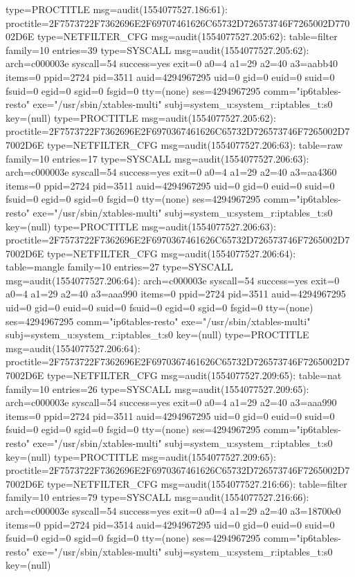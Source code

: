 \documentclass[]{report}
\newenvironment{Shaded}{}{}
\newcommand{\NormalTok}[1]{#1}
\begin{document}
\begin{Shaded}
\begin{Highlighting}[]
\NormalTok{type=PROCTITLE msg=audit(1554077527.186:61): proctitle=2F7573722F7362696E2F69707461626C65732D726573746F7265002D77002D6E}
\NormalTok{type=NETFILTER_CFG msg=audit(1554077527.205:62): table=filter family=10 entries=39}
\NormalTok{type=SYSCALL msg=audit(1554077527.205:62): arch=c000003e syscall=54 success=yes exit=0 a0=4 a1=29 a2=40 a3=aabb40 items=0 ppid=2724 pid=3511 auid=4294967295 uid=0 gid=0 euid=0 suid=0 fsuid=0 egid=0 sgid=0 fsgid=0 tty=(none) ses=4294967295 comm="ip6tables-resto" exe="/usr/sbin/xtables-multi" subj=system_u:system_r:iptables_t:s0 key=(null)}
\NormalTok{type=PROCTITLE msg=audit(1554077527.205:62): proctitle=2F7573722F7362696E2F6970367461626C65732D726573746F7265002D77002D6E}
\NormalTok{type=NETFILTER_CFG msg=audit(1554077527.206:63): table=raw family=10 entries=17}
\NormalTok{type=SYSCALL msg=audit(1554077527.206:63): arch=c000003e syscall=54 success=yes exit=0 a0=4 a1=29 a2=40 a3=aa4360 items=0 ppid=2724 pid=3511 auid=4294967295 uid=0 gid=0 euid=0 suid=0 fsuid=0 egid=0 sgid=0 fsgid=0 tty=(none) ses=4294967295 comm="ip6tables-resto" exe="/usr/sbin/xtables-multi" subj=system_u:system_r:iptables_t:s0 key=(null)}
\NormalTok{type=PROCTITLE msg=audit(1554077527.206:63): proctitle=2F7573722F7362696E2F6970367461626C65732D726573746F7265002D77002D6E}
\NormalTok{type=NETFILTER_CFG msg=audit(1554077527.206:64): table=mangle family=10 entries=27}
\NormalTok{type=SYSCALL msg=audit(1554077527.206:64): arch=c000003e syscall=54 success=yes exit=0 a0=4 a1=29 a2=40 a3=aaa990 items=0 ppid=2724 pid=3511 auid=4294967295 uid=0 gid=0 euid=0 suid=0 fsuid=0 egid=0 sgid=0 fsgid=0 tty=(none) ses=4294967295 comm="ip6tables-resto" exe="/usr/sbin/xtables-multi" subj=system_u:system_r:iptables_t:s0 key=(null)}
\NormalTok{type=PROCTITLE msg=audit(1554077527.206:64): proctitle=2F7573722F7362696E2F6970367461626C65732D726573746F7265002D77002D6E}
\NormalTok{type=NETFILTER_CFG msg=audit(1554077527.209:65): table=nat family=10 entries=26}
\NormalTok{type=SYSCALL msg=audit(1554077527.209:65): arch=c000003e syscall=54 success=yes exit=0 a0=4 a1=29 a2=40 a3=aaa990 items=0 ppid=2724 pid=3511 auid=4294967295 uid=0 gid=0 euid=0 suid=0 fsuid=0 egid=0 sgid=0 fsgid=0 tty=(none) ses=4294967295 comm="ip6tables-resto" exe="/usr/sbin/xtables-multi" subj=system_u:system_r:iptables_t:s0 key=(null)}
\NormalTok{type=PROCTITLE msg=audit(1554077527.209:65): proctitle=2F7573722F7362696E2F6970367461626C65732D726573746F7265002D77002D6E}
\NormalTok{type=NETFILTER_CFG msg=audit(1554077527.216:66): table=filter family=10 entries=79}
\NormalTok{type=SYSCALL msg=audit(1554077527.216:66): arch=c000003e syscall=54 success=yes exit=0 a0=4 a1=29 a2=40 a3=18700e0 items=0 ppid=2724 pid=3514 auid=4294967295 uid=0 gid=0 euid=0 suid=0 fsuid=0 egid=0 sgid=0 fsgid=0 tty=(none) ses=4294967295 comm="ip6tables-resto" exe="/usr/sbin/xtables-multi" subj=system_u:system_r:iptables_t:s0 key=(null)}

\end{Highlighting}
\end{Shaded}
\end{document}
